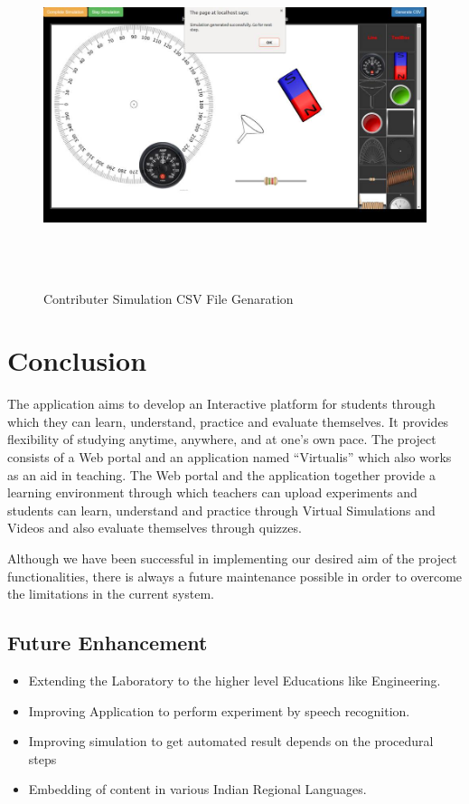 \documentclass[12pt]{report}
\begin{document}
\begin{figure}[H]
 \centering 
 \includegraphics[width=15cm, height=10cm]{./325.jpg}
 \caption{Contributer Simulation CSV File Genaration\label{fig:325}}
\end{figure}

\chapter{Conclusion}

The application aims to develop an Interactive platform for students through which they can learn, understand, practice and evaluate themselves. It provides flexibility of studying anytime, anywhere, and at one's own pace. The project consists of a Web portal and an application named ``Virtualis” which also works as an aid in teaching. The Web portal and the application together provide a learning environment through which teachers can upload experiments and students can learn, understand and practice through Virtual Simulations and Videos and also evaluate themselves through quizzes.\newline

Although we have been successful in implementing our desired aim of the project functionalities, there is always a future maintenance possible in order to overcome the limitations in the current system.

\section{Future Enhancement}

\begin{itemize}
\item Extending the Laboratory to the higher level Educations like Engineering.
\item Improving Application to perform experiment by  speech recognition.
\item Improving simulation to get automated result depends on the procedural steps
\item Embedding of content in various Indian Regional Languages.
\end{itemize}
\end{document}
